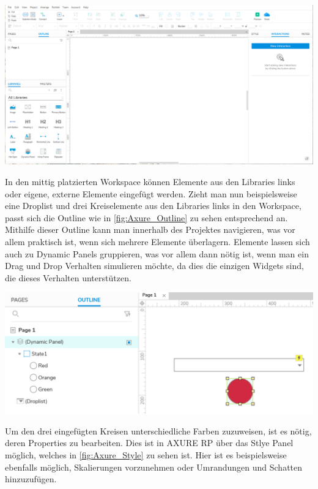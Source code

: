 \begin{center}
  \includegraphics[scale=0.3]{figures/Axure_Full.png}
  \label{fig:Axure_Full}
\end{center}

In den mittig platzierten Workspace können Elemente aus den Libraries links oder eigene, externe Elemente eingefügt werden.
Zieht man nun beispielsweise eine Droplist und drei Kreiselemente aus den Libraries links in den Workspace, passt sich die Outline wie in \cref{fig:Axure_Outline} zu sehen entsprechend an.
Mithilfe dieser Outline kann man innerhalb des Projektes navigieren, was vor allem praktisch ist, wenn sich mehrere Elemente überlagern.
Elemente lassen sich auch zu Dynamic Panels gruppieren, was vor allem dann nötig ist, wenn man ein Drag und Drop Verhalten simulieren möchte, da dies die einzigen Widgets sind, die dieses Verhalten unterstützen.

\begin{center}
  \includegraphics[scale=0.4]{figures/AXURE_Outline.PNG}
  \label{fig:Axure_Outline}
\end{center}

Um den drei eingefügten Kreisen unterschiedliche Farben zuzuweisen, ist es nötig, deren Properties zu bearbeiten.
Dies ist in AXURE RP über das Stlye Panel möglich, welches in \cref{fig:Axure_Style} zu sehen ist.
Hier ist es beispielsweise ebenfalls möglich, Skalierungen vorzunehmen oder Umrandungen und Schatten hinzuzufügen.

